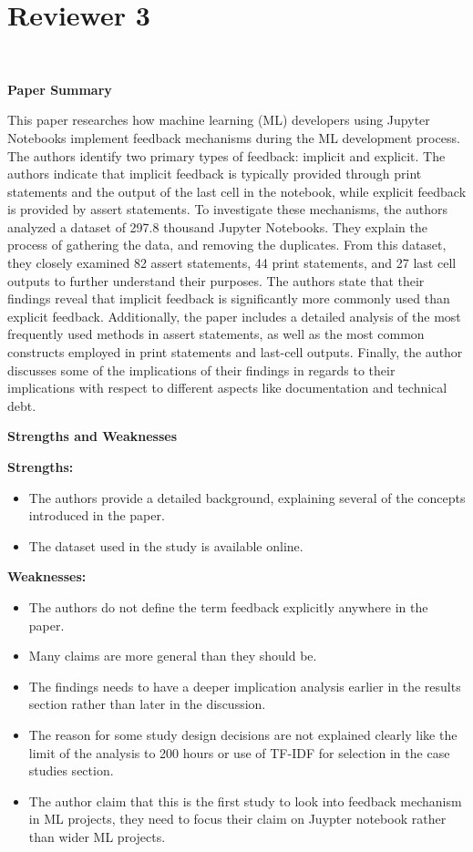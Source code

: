 \documentclass[11pt,fleqn]{article}
\newcommand{\eline}{\vspace*{.75\baselineskip}}
\newcommand{\Referee}[1]{\eline \noindent {\bf Reviewer comment #1:} \\}
\newcommand{\newreviewer}[1]{\section*{Reviewer #1}\vspace*{-1.05\baselineskip}}
\newenvironment{revcomment}[1][]
{\Referee{#1}\begin{rcomment}}
{\end{rcomment}}
\begin{document}
\newreviewer{3}
\begin{revcomment}[3.1]
  \textbf{Paper Summary}

  This paper researches how machine learning (ML) developers using Jupyter Notebooks implement feedback mechanisms during the ML development process. The authors identify two primary types of feedback: implicit and explicit. The authors indicate that implicit feedback is typically provided through print statements and the output of the last cell in the notebook, while explicit feedback is provided by assert statements. To investigate these mechanisms, the authors analyzed a dataset of 297.8 thousand Jupyter Notebooks. They explain the process of gathering the data, and removing the duplicates. From this dataset, they closely examined 82 assert statements, 44 print statements, and 27 last cell outputs to further understand their purposes. The authors state that their findings reveal that implicit feedback is significantly more commonly used than explicit feedback. Additionally, the paper includes a detailed analysis of the most frequently used methods in assert statements, as well as the most common constructs employed in print statements and last-cell outputs. Finally, the author discusses some of the implications of their findings in regards to their implications with respect to different aspects like documentation and technical debt.

  \textbf{Strengths and Weaknesses}

  \textbf{Strengths:}
  \begin{itemize}
  \item The authors provide a detailed background, explaining several of the concepts introduced in the paper.
  \item The dataset used in the study is available online.
  \end{itemize}

  \textbf{Weaknesses:}
  \begin{itemize}
  \item The authors do not define the term feedback explicitly anywhere in the paper.
  \item Many claims are more general than they should be.
  \item The findings needs to have a deeper implication analysis earlier in the results section rather than later in the discussion.
  \item The reason for some study design decisions are not explained clearly like the limit of the analysis to 200 hours or use of TF-IDF for selection in the case studies section.
  \item The author claim that this is the first study to look into feedback mechanism in ML projects, they need to focus their claim on Juypter notebook rather than wider ML projects.
  \end{itemize}
\end{revcomment}
\end{document}
